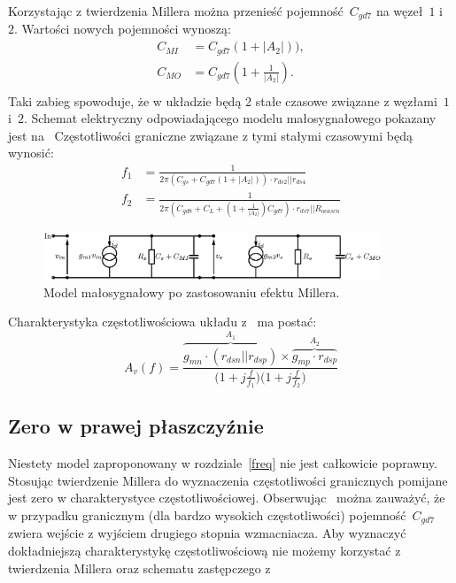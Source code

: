 \documentclass[twoside,pl,final]{labman}
\begin{document}
Korzystając z twierdzenia Millera można przenieść
pojemność~$C_{gd7}$ na węzeł~$1$ i~$2$.
Wartości nowych pojemności wynoszą:
\begin{align}
  C_{MI} &= C_{gd7}(1 + |A_2|)), \\
  C_{MO} &= C_{gd7}(1 + \frac{1}{|A_2|}). \\
\end{align}
Taki zabieg spowoduje, że w układzie będą
2 stałe czasowe związane z węzłami~$1$ i~$2$.
Schemat elektryczny odpowiadającego modelu
małosygnałowego pokazany jest na~
Częstotliwości graniczne związane z tymi stałymi czasowymi będą wynosić:
\begin{align}
  f_1 &= \frac{1}{2 \pi (C_{gs} + C_{gd7}(1 + |A_2|)) \cdot r_{ds2} || r_{ds4}}
  \label{eqn:freq:pole:low} \\
  f_2 &= \frac{1}{2 \pi (C_{gd8} + C_L + (1 + \frac{1}{|A_2|})C_{gd7}) \cdot
  r_{ds7} || R_{ocascn}}
  \label{eqn:freq:pole:high}
\end{align}

\begin{figure}[!htbp]
  \centering
  \includegraphics[width=0.9\textwidth]{miller}
  \caption{Model małosygnałowy po zastosowaniu efektu Millera.}
  \label{fig:miller}
\end{figure}

Charakterystyka częstotliwościowa układu z~ ma postać:
\begin{equation}
  A_v(f) = \frac{\overbrace{g_{mn} \cdot (r_{dsn} || r_{dsp})}^{A_1} \times
                 \overbrace{g_{mp} \cdot r_{dsp}}^{A_2}}
                {\Big(1 + j \frac{f}{f_1}\Big)\Big(1 + j \frac{f}{f_2}\Big)}
\end{equation}

\subsection{Zero w prawej płaszczyźnie}
\label{freq:rhp}
Niestety model zaproponowany w rozdziale~\ref{freq}
nie jest całkowicie poprawny.
Stosując twierdzenie Millera do wyznaczenia częstotliwości granicznych
pomijane jest zero w charakterystyce częstotliwościowej.
Obserwując~ można zauważyć,
że w przypadku granicznym (dla bardzo wysokich częstotliwości)
pojemność~$C_{gd7}$ zwiera wejście z wyjściem drugiego stopnia wzmacniacza.
Aby wyznaczyć dokładniejszą charakterystykę częstotliwościową
nie możemy korzystać z twierdzenia Millera
oraz schematu zastępczego z~
\end{document}
